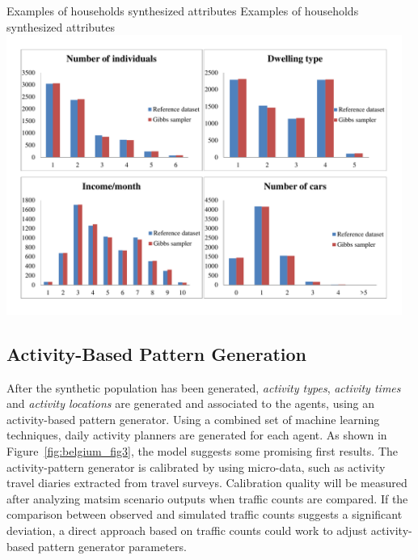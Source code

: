 \createfigure%
{Examples of households synthesized attributes}%
{Examples of households synthesized attributes}%
{\label{fig:belgium_fig2}}%
{\includegraphics[width=0.97\textwidth, angle=0]{scenarios/figures/belgium_fig2.pdf}}%
{}

\subsection{Activity-Based Pattern Generation}
After the synthetic population has been generated, \emph{activity types}, \emph{activity times} and \emph{activity locations} are generated and associated to the agents, using an activity-based pattern generator. 
Using a combined set of machine learning techniques, daily activity planners are generated for each agent. 
As shown in Figure~\ref{fig:belgium_fig3}, the model suggests some promising first results. The activity-pattern generator is calibrated by using micro-data, such as activity travel diaries extracted from travel surveys. 
Calibration quality will be measured after analyzing \gls{matsim} scenario outputs when traffic counts are compared. 
If the comparison between observed and simulated traffic counts suggests a significant deviation, a direct approach based on traffic counts \citep[][]{CoolsEtAl_TRR_2010} could work to adjust activity-based pattern generator parameters.

